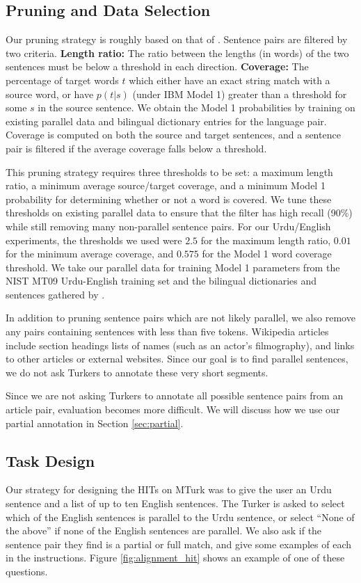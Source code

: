 \documentclass[11pt,letterpaper]{article}
\begin{document}
\subsection{Pruning and Data Selection}
\label{sec:turk_data}
Our pruning strategy is roughly based on that of . Sentence
pairs are filtered by two criteria. {\bf Length ratio:} The ratio between the
lengths (in words) of the two sentences must be below a threshold in each
direction. {\bf Coverage:} The percentage of target words $t$ which either have an
exact string match with a source word, or have $p(t|s)$ (under IBM Model 1)
greater than a threshold for some $s$ in the source sentence. We obtain the
Model 1 probabilities by training on existing parallel data and bilingual
dictionary entries for the language pair. Coverage is computed on both the
source and target sentences, and a sentence pair is filtered if the average
coverage falls below a threshold.

This pruning strategy requires three thresholds to be set: a maximum length
ratio, a minimum average source/target coverage, and a minimum Model 1
probability for determining whether or not a word is covered. We tune these
thresholds on existing parallel data to ensure that the filter has high recall
(90\%) while still removing many non-parallel sentence pairs. For our
Urdu/English experiments, the thresholds we used were $2.5$ for the maximum
length ratio, $0.01$ for the minimum average coverage, and $0.575$ for the Model 1
word coverage threshold. We take our parallel data for training Model 1
parameters from the NIST MT09 Urdu-English training set and the
bilingual dictionaries and sentences gathered by .

In addition to pruning sentence pairs which are not likely parallel, we also
remove any pairs containing sentences with less than five tokens. Wikipedia
articles include section headings lists of names (such as an actor's
filmography), and links to other articles or external websites. Since our goal
is to find parallel sentences, we do not ask Turkers to annotate these very
short segments.

Since we are not asking Turkers to annotate all possible sentence pairs from an
article pair, evaluation becomes more difficult. We will discuss how we use our
partial annotation in Section \ref{sec:partial}.

\subsection{Task Design}
\label{sec:design}
Our strategy for designing the HITs on MTurk was to give the user an Urdu
sentence and a list of up to ten English sentences. The Turker is asked to
select which of the English sentences is parallel to the Urdu sentence, or
select ``None of the above'' if none of the English sentences are parallel. We
also ask if the sentence pair they find is a partial or full match, and give
some examples of each in the instructions. Figure \ref{fig:alignment_hit} shows
an example of one of these questions.
\end{document}
